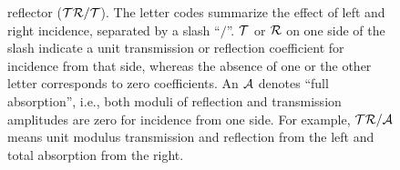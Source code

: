 \begin{figure}
{reflector ($\cal{TR/T}$).
The letter codes summarize the effect of left and right incidence, separated by a  slash ``$/$''.
${\cal T}$ or ${\cal R}$ on one side of the slash indicate a unit
transmission or reflection coefficient
for  incidence from that side, whereas the absence of one or the other letter corresponds to zero coefficients.
An ${\cal A}$ denotes ``full absorption'', i.e., both moduli of reflection and transmission amplitudes are zero for incidence from one side.
For example,  $\cal{TR/A}$ means unit modulus transmission
and reflection from the left and total absorption from the right.
\label{cases}}
\end{figure}



